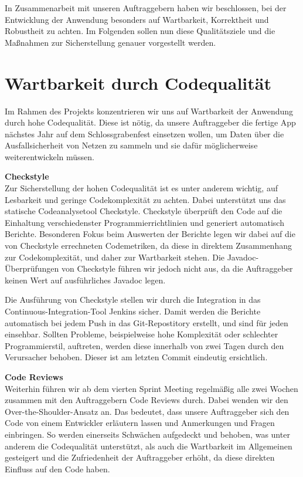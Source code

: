 
In Zusammenarbeit mit unseren Auftraggebern haben wir beschlossen, bei der Entwicklung der Anwendung besonders auf Wartbarkeit, Korrektheit und Robustheit zu achten. Im Folgenden sollen nun diese Qualitätsziele und die Maßnahmen zur Sicherstellung genauer vorgestellt werden.

\section{Wartbarkeit durch Codequalität}
Im Rahmen des Projekts konzentrieren wir uns auf Wartbarkeit der Anwendung durch hohe Codequalität. Diese ist nötig, da unsere Auftraggeber die fertige App nächstes Jahr auf dem Schlossgrabenfest einsetzen wollen, um Daten über die Ausfallsicherheit von Netzen zu sammeln und sie dafür möglicherweise weiterentwickeln müssen.

\textbf{Checkstyle}\\
Zur Sicherstellung der hohen Codequalität ist es unter anderem wichtig, auf Lesbarkeit und geringe Codekomplexität zu achten. Dabei unterstützt uns das statische Codeanalysetool Checkstyle. Checkstyle überprüft den Code auf die Einhaltung verschiedenster Programmierrichtlinien und generiert automatisch Berichte. Besonderen Fokus beim Auswerten der Berichte legen wir dabei auf die von Checkstyle errechneten Codemetriken, da diese in direktem Zusammenhang zur Codekomplexität, und daher zur Wartbarkeit stehen. Die Javadoc-Überprüfungen von Checkstyle führen wir jedoch nicht aus, da die Auftraggeber keinen Wert auf ausführliches Javadoc legen.
    
Die Ausführung von Checkstyle stellen wir durch die Integration in das Continuous-Integration-Tool Jenkins sicher. Damit werden die Berichte automatisch bei jedem Push in das Git-Repostitory erstellt, und sind für jeden einsehbar. Sollten Probleme, beispielweise hohe Komplexität oder schlechter Programmierstil, auftreten, werden diese innerhalb von zwei Tagen durch den Verursacher behoben. Dieser ist am letzten Commit eindeutig ersichtlich.
    
\textbf{Code Reviews}\\
Weiterhin führen wir ab dem vierten Sprint Meeting regelmäßig alle zwei Wochen zusammen mit den Auftraggebern Code Reviews durch. Dabei wenden wir den Over-the-Shoulder-Ansatz an. Das bedeutet, dass unsere Auftraggeber sich den Code von einem Entwickler erläutern lassen und Anmerkungen und Fragen einbringen. So werden einerseits Schwächen aufgedeckt und behoben, was unter anderem die Codequalität unterstützt, als auch die Wartbarkeit im Allgemeinen gesteigert und die Zufriedenheit der Auftraggeber erhöht, da diese direkten Einfluss auf den Code haben.
    
